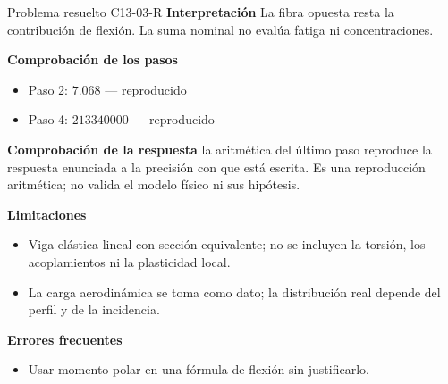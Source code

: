 \documentclass[10pt,openany]{book}
\begin{document}
\begin{studiumworked}{Problema resuelto C13-03-R}
\noindent\textbf{Interpretación}
La fibra opuesta resta la contribución de flexión. La suma nominal no evalúa fatiga ni concentraciones.

\noindent\textbf{Comprobación de los pasos}
\begin{itemize}
\item Paso 2: $7.068$ — reproducido
\item Paso 4: $213340000$ — reproducido
\end{itemize}

\noindent\textbf{Comprobación de la respuesta} la aritmética del último paso reproduce la respuesta enunciada a la precisión con que está escrita. Es una reproducción aritmética; no valida el modelo físico ni sus hipótesis.

\noindent\textbf{Limitaciones}
\begin{itemize}
\item Viga elástica lineal con sección equivalente; no se incluyen la torsión, los acoplamientos ni la plasticidad local.
\item La carga aerodinámica se toma como dato; la distribución real depende del perfil y de la incidencia.
\end{itemize}

\noindent\textbf{Errores frecuentes}
\begin{itemize}
\item Usar momento polar en una fórmula de flexión sin justificarlo.
\end{itemize}
\end{studiumworked}
\end{document}
